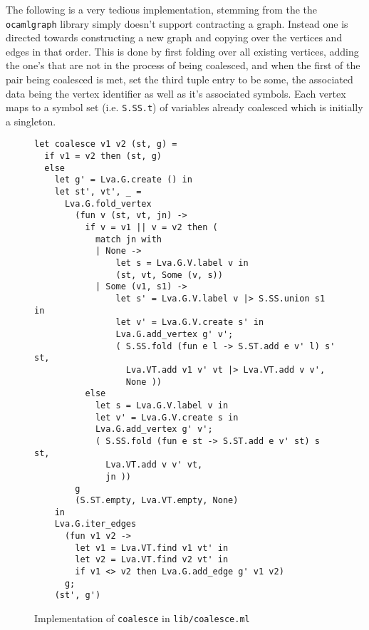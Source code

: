 \documentclass{article}
\begin{document}


The following is a very tedious implementation, stemming from the the \texttt{ocamlgraph} library simply doesn't support contracting a graph. Instead one is directed towards constructing a new graph and copying over the vertices and edges in that order. This is done by first folding over all existing vertices,  adding the one's that are not in the process of being coalesced, and when the first of the pair being coalesced is met, set the third tuple entry to be some, the associated data being the vertex identifier as well as it's associated symbols. Each vertex maps to a symbol set (i.e. \texttt{S.SS.t}) of variables already coalesced which is initially a singleton.


\begin{figure}[H]
  \centering
  \begin{verbatim}
let coalesce v1 v2 (st, g) =
  if v1 = v2 then (st, g)
  else
    let g' = Lva.G.create () in
    let st', vt', _ =
      Lva.G.fold_vertex
        (fun v (st, vt, jn) ->
          if v = v1 || v = v2 then (
            match jn with
            | None ->
                let s = Lva.G.V.label v in
                (st, vt, Some (v, s))
            | Some (v1, s1) ->
                let s' = Lva.G.V.label v |> S.SS.union s1 in
                let v' = Lva.G.V.create s' in
                Lva.G.add_vertex g' v';
                ( S.SS.fold (fun e l -> S.ST.add e v' l) s' st,
                  Lva.VT.add v1 v' vt |> Lva.VT.add v v',
                  None ))
          else
            let s = Lva.G.V.label v in
            let v' = Lva.G.V.create s in
            Lva.G.add_vertex g' v';
            ( S.SS.fold (fun e st -> S.ST.add e v' st) s st,
              Lva.VT.add v v' vt,
              jn ))
        g
        (S.ST.empty, Lva.VT.empty, None)
    in
    Lva.G.iter_edges
      (fun v1 v2 ->
        let v1 = Lva.VT.find v1 vt' in
        let v2 = Lva.VT.find v2 vt' in
        if v1 <> v2 then Lva.G.add_edge g' v1 v2)
      g;
    (st', g')
  \end{verbatim}
  \caption{Implementation of \texttt{coalesce} in \texttt{lib/coalesce.ml}}\label{fig:coalesce.ml}
\end{figure}
\end{document}
